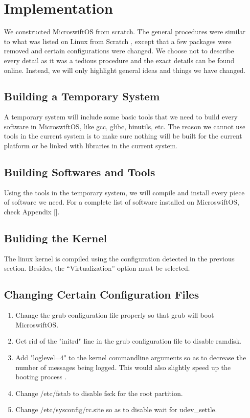 \section{Implementation}

We constructed MicroswiftOS from scratch. The general procedures were similar to what was listed on Linux from Scratch \cite{beekmans1999linux}, except that a few packages were removed and certain configurations were changed. We choose not to describe every detail as it was a tedious procedure and the exact details can be found online. Instead, we will only highlight general ideas and things we have changed.

\subsection{Building a Temporary System}

A temporary system will include some basic tools that we need to build every software in MicroswiftOS, like gcc, glibc, binutils, etc.
The reason we cannot use tools in the current system is to make sure nothing will be built for the current platform or be linked with libraries in the current system.

\subsection{Building Softwares and Tools}

Using the tools in the temporary system, we will compile and install every piece of software we need.
For a complete list of software installed on MicroswiftOS, check Appendix [].

\subsection{Buliding the Kernel}
The linux kernel is compiled using the configuration detected in the previous section. Besides, the “Virtualization” option must be selected.

\subsection{Changing Certain Configuration Files}
\begin{enumerate}
\item
Change the grub configuration file properly so that grub will boot MicroswiftOS.
\item
Get rid of the "initrd" line in the grub configuration file to disable ramdisk.
\item
Add "loglevel=4" to the kernel commandline arguments so as to decrease the number of messages being logged. This would also slightly speed up the booting process \cite{bird2004methods}.
\item
Change /etc/fstab to disable fsck for the root partition.
\item
Change /etc/sysconfig/rc.site so as to disable wait for udev\_settle.
\end{enumerate}

